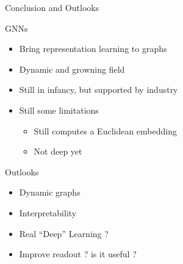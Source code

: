 \documentclass[11pt]{beamer}
\begin{document}
\begin{frame}{Conclusion and Outlooks}

  \begin{block}{GNNs}
    \begin{itemize}
    \item Bring representation learning to graphs
    \item Dynamic and growning field
    \item Still in infancy, but supported by industry
    \item Still some limitations
      \begin{itemize}
      \item Still computes a Euclidean embedding
      \item Not deep yet
      \end{itemize}
    \end{itemize}
  \end{block}

  \begin{block}{Outlooks}
    \begin{itemize}
    \item Dynamic graphs
    \item Interpretability
    \item Real ``Deep'' Learning ?
    \item Improve readout ? is it useful ?  
    \end{itemize}
  \end{block}
\end{frame}
\end{document}
